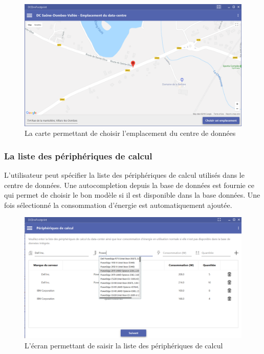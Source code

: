 \begin{figure}[h!]
	\begin{center}
		\includegraphics[scale=0.50]{partie3/images/carte.png}
		\caption{La carte permettant de choisir l'emplacement du centre de données}
	\end{center}
\end{figure}
\newpage
\subsubsection{La liste des périphériques de calcul}
L'utilisateur peut spécifier la liste des périphériques de calcul utilisés dans le centre de données. Une autocompletion depuis la base de données est fournie ce qui permet de choisir le bon modèle si il est disponible dans la base données. Une fois sélectionné la consommation d'énergie est automatiquement ajoutée.

\begin{figure}[h!]
	\begin{center}
		\includegraphics[scale=0.4]{partie3/images/calculation.png}
		\caption{L'écran permettant de saisir la liste des périphériques de calcul}
	\end{center}
\end{figure}


